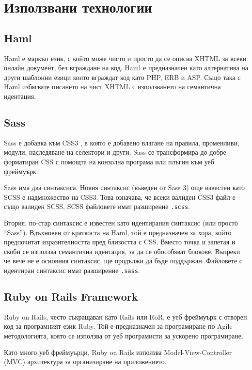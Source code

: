 \documentclass[a4paper]{article}
\begin{document}
\section{Използвани технологии}

  \subsection{Haml}
  Haml е \cite{haml} маркъп език, с който може чисто и просто да се описва XHTML за всеки онлайн документ, без вграждане на код. Haml е предназначен като алтернатива на други шаблонни езици които вграждат код като PHP, ERB и ASP. Също така с Haml избягвате писането на чист XHTML с използването на семантична идентация.

  \subsection{Sass}
  Sass \cite{sass} е добавка към CSS3 \cite{css}, в която е добавено влагане на правила, променливи, модули, наследяване на селектори и други. Sass се трансформира до добре форматиран CSS с помощта на конзолна програма или плъгин към уеб фреймуърк.

  Sass има два синтаксиса. Новия синтаксис (въведен от Sass 3) още известен като SCSS е надмножество на CSS3. Това означава, че всеки валиден CSS3 файл е също валиден SCSS. SCSS файловете имат разширение \texttt{.scss}.

  Втория, по-стар синтаксис е известен като идентирания синтаксис (или просто ``Sass''). Вдъхновен от краткоста на Haml, той е предназначен за хора, който предпочитат изразителността пред близостта с CSS. Вместо точка и запетая и скоби се използва семантична идентация, за да се обособяват блокове. Въпреки че вече не е основния синтаксис, ще продължи да бъде поддържан. Файловете с идентиран синтаксис имат разширение \texttt{.sass}.

  \subsection{Ruby on Rails Framework}
  Ruby on Rails, често съкращаван като Rails или RoR, е уеб фреймуърк с отворен код за програмният език Ruby. Той е предназначен за програмиране по Agile методологията, която се използва от уеб програмисти за ускорено програмиране.

  Като много уеб фреймуърци, Ruby on Rails използва Model-View-Controller (MVC) архитектура за организиране на приложението.
\end{document}
